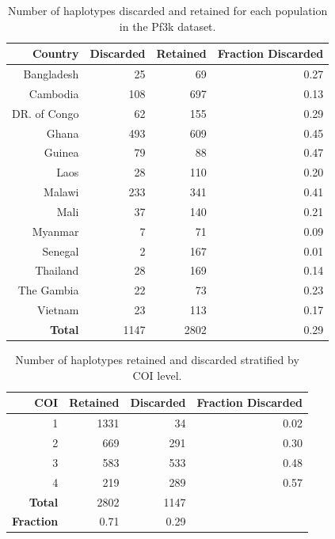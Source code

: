 \documentclass[9pt]{article}
\begin{document}
\begin{table}[ht]
\centering
\begin{tabular}{r|r|r|r}
\textbf{Country}  & \textbf{Discarded} & \textbf{Retained} &\textbf{Fraction Discarded} \\
\hline
Bangladesh & 25 & 69 & 0.27 \\
Cambodia & 108 & 697 & 0.13 \\
DR. of Congo & 62 & 155 & 0.29 \\
Ghana & 493 & 609 & 0.45 \\
Guinea & 79 & 88 & 0.47 \\
Laos & 28 & 110 & 0.20 \\
Malawi & 233 & 341 & 0.41 \\
Mali & 37 & 140 & 0.21 \\
Myanmar & 7 & 71 & 0.09 \\
Senegal & 2 & 167 & 0.01\\
Thailand & 28 & 169 & 0.14 \\
The Gambia & 22 & 73 & 0.23 \\
Vietnam & 23 & 113 & 0.17\\
\hline
\textbf{Total} & 1147 & 2802 & 0.29
\end{tabular}
\vspace{.2cm}
\caption{Number of haplotypes discarded and retained for each population in the Pf3k dataset.}
\label{table:haps-discarded-by-country}
\end{table}


\begin{table}[ht]
\centering
\begin{tabular}{r|r|r|r}
\textbf{COI}  & \textbf{Retained} & \textbf{Discarded} & \textbf{Fraction Discarded} \\
\hline
1 & 1331 & 34 & 0.02 \\
2 & 669 & 291 & 0.30 \\
3 & 583 & 533 & 0.48 \\
4 & 219 & 289 & 0.57 \\
\hline
\textbf{Total} & 2802 & 1147 &  \\
\hline
\textbf{Fraction} & 0.71 & 0.29 & \\
\end{tabular}
\vspace{.2cm}
\caption{Number of haplotypes retained and discarded stratified by COI level.}
\label{table:haps-discarded-by-COI}
\end{table}
\end{document}

